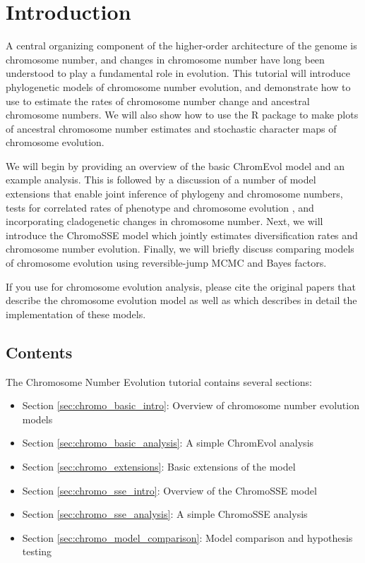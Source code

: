 \section*{Introduction}

A central organizing component of the higher-order architecture of the
genome is chromosome number, and changes in chromosome number have long
been understood to play a fundamental role in evolution.
This tutorial will introduce phylogenetic models of chromosome number evolution,
and demonstrate how to use \RevBayes 
to estimate the rates of chromosome number change and ancestral chromosome numbers.
We will also show how to use the \RevGadgets R package to make plots of ancestral
chromosome number estimates and stochastic character maps of chromosome evolution.

We will begin by providing an overview of the basic ChromEvol model \citep{mayrose2010probabilistic} and 
an example \RevBayes analysis. 
This is followed by a discussion of a number of model extensions 
that enable joint inference of phylogeny
and chromosome numbers, 
tests for correlated rates of phenotype and chromosome evolution \citep[the BiChroM model;][]{zenil2017testing},
and incorporating cladogenetic changes in chromosome number.
Next, we will introduce the ChromoSSE model \citep{freyman2016cladogenetic} which jointly
estimates diversification rates and chromosome number evolution.
Finally, we will briefly discuss comparing models of chromosome evolution using
reversible-jump MCMC and Bayes factors.

If you use \RevBayes for chromosome evolution analysis, please cite the original 
papers that describe the chromosome evolution model as well as \citet{freyman2016cladogenetic}
which describes in detail the \RevBayes implementation of these models.

\subsection*{Contents}

The Chromosome Number Evolution tutorial contains several sections:

\begin{itemize}
\item Section \ref{sec:chromo_basic_intro}: Overview of chromosome number evolution models
\item Section \ref{sec:chromo_basic_analysis}: A simple ChromEvol analysis
\item Section \ref{sec:chromo_extensions}: Basic extensions of the model
\item Section \ref{sec:chromo_sse_intro}: Overview of the ChromoSSE model
\item Section \ref{sec:chromo_sse_analysis}: A simple ChromoSSE analysis
\item Section \ref{sec:chromo_model_comparison}: Model comparison and hypothesis testing 
\end{itemize}

